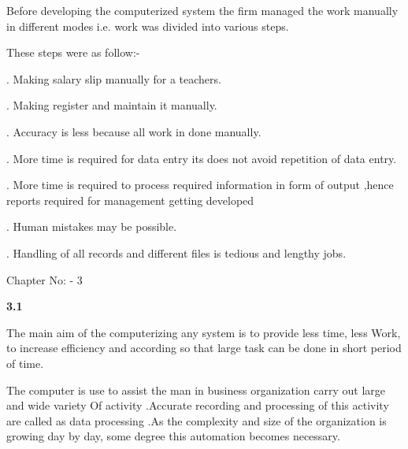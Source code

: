 \documentclass{article} %
\begin{document}
\noindent \textbf{}\underbar{}

\noindent 

\noindent Before developing the computerized system the firm managed the work manually in different modes i.e. work was divided into various steps. 

\noindent These steps were as follow:- 

. Making salary slip manually for a teachers. 

. Making register and maintain it manually. 

\noindent \underbar{}

\noindent \textbf{}\underbar{}

\noindent 

. Accuracy is less because all work in done manually. 

. More time is required for data entry its does not avoid repetition of data entry. 

. More time is required to process required information in form of output ,hence reports required for management getting developed 

. Human mistakes may be possible. 

. Handling of all records and different files is tedious and lengthy jobs. 

\noindent 

\noindent 

\noindent 

\noindent                                                            Chapter No: - 3 

\noindent \textbf{                                   }

\noindent \underbar{}

\noindent \textbf{3.1 }\underbar{}

\noindent \textbf{}\underbar{}

\noindent 

\noindent The main aim of the computerizing any system is to provide less time, less Work, to increase efficiency and according so that large task can be done in short period of time. 

\noindent The computer is use to assist the man in business organization carry out large and wide variety Of activity .Accurate recording and processing of this activity are called as data processing .As the complexity and size of the organization is growing day by day, some degree this automation becomes necessary. 
\end{document}
